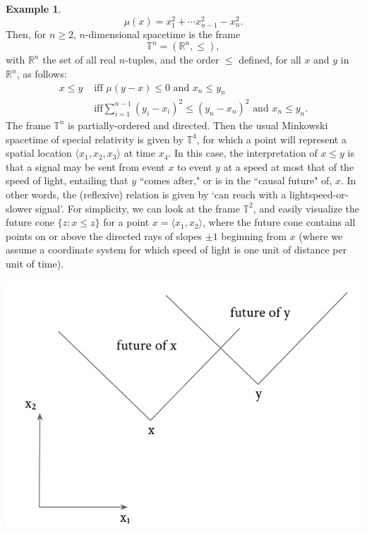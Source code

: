\documentclass[a4paper]{book}
\theoremstyle{definition}
\newtheorem{example}{Example}[section]
\theoremstyle{definition}
\theoremstyle{definition}
\theoremstyle{theorem}
\theoremstyle{definition}
\begin{document}
\begin{example}
	\begin{equation*}
	\mu(x) = x_1^2 + \cdots x_{n-1}^2 - x_n^2.
	\end{equation*}
	Then, for $n \geq 2$, $n$-dimensional spacetime is the frame 
	\begin{equation*}
	\mathbb{T}^n = (\mathbb{R}^n, \leq),
	\end{equation*} 
	with $\mathbb{R}^n$ the set of all real $n$-tuples, and the order $\leq$ defined, for all $x$ and $y$ in $\mathbb{R}^n$, as follows: 
	\begin{equation*}
	\begin{split} 
	x \leq y & \text{ iff } \mu(y-x) \leq 0 \text{ and } x_n \leq y_n \\
	& \text{ iff} \sum_{i=1}^{n-1} (y_i - x_i)^2 \leq (y_n - x_n)^2 \text{ and } x_n \leq y_n. 
	\end{split}  
	\end{equation*}
	The frame $\mathbb{T}^n$ is partially-ordered and directed. 
	Then the usual Minkowski spacetime of special relativity is given by $\mathbb{T}^4$, for which a point will represent a spatial location $\langle x_1, x_2, x_3 \rangle$ at time $x_4$. In this case, the interpretation of $x \leq y$ is that a signal may be sent from event $x$ to event $y$ at a speed at most that of the speed of light, entailing that $y$ ``comes after," or is in the ``causal future" of, $x$. In other words, the (reflexive) relation is given by `can reach with a lightspeed-or-slower signal'. For simplicity, we can look at the frame $\mathbb{T}^2$, and easily visualize the future cone $\{z: x \leq z \}$ for a point $x = \langle x_1, x_2 \rangle$, where the future cone contains all points on or above the directed rays of slopes $\pm 1$ beginning from $x$ (where we assume a coordinate system for which speed of light is one unit of distance per unit of time). 
	\begin{center}
		\includegraphics*[scale =0.4]{FutureLightCone.png}

\end{center}
\end{example}
\end{document}
